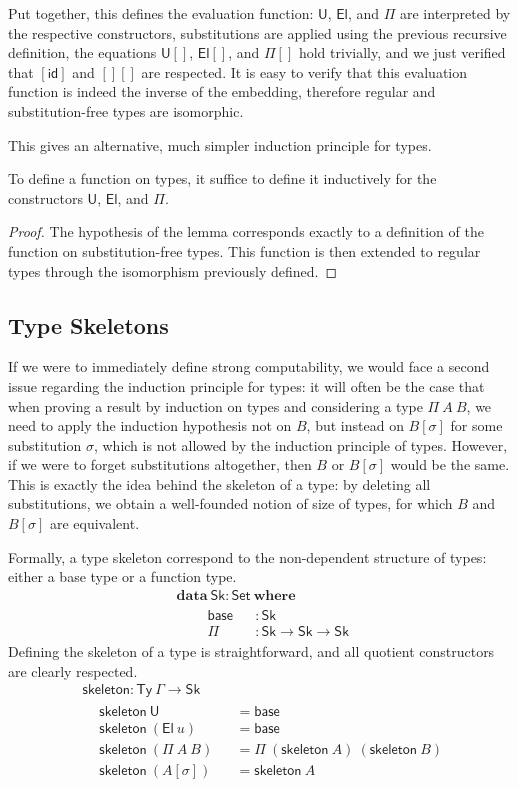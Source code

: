 \documentclass[a4paper,UKenglish,cleveref]{lipics-v2019}
\newcommand{\agdaSymb}[1]{\mathsf{#1}}
\newcommand{\agdaKW}[1]{\mathbf{#1}}
\newcommand{\ind}{\hspace{1em}}
\newcommand{\data}{\agdaKW{data}}
\newcommand{\where}{\agdaKW{where}}
\newcommand{\Set}{\agdaSymb{Set}}
\newcommand{\Ty}{\agdaSymb{Ty}}
\newcommand{\id}{\agdaSymb{id}}
\newcommand{\U}{\agdaSymb{U}}
\newcommand{\El}{\agdaSymb{El}}
\newcommand{\Sk}{\agdaSymb{Sk}}
\newcommand{\base}{\agdaSymb{base}}
\newcommand{\skel}{\agdaSymb{skeleton}}
\begin{document}
Put together, this defines the evaluation function: $\U$, $\El$, and $\Pi$ are
interpreted by the respective constructors, substitutions are applied using the
previous recursive definition, the equations $\U[]$, $\El[]$, and $\Pi[]$ hold
trivially, and we just verified that $[\id]$ and $[][]$ are respected.
It is easy to verify that this evaluation function is indeed the inverse of
the embedding, therefore regular and substitution-free types are isomorphic.

This gives an alternative, much simpler induction principle for types.
\begin{lemma}
  \label{lem:typeInduction}
  To define a function on types, it suffice to define it inductively for the
  constructors $\U$, $\El$, and $\Pi$.
\end{lemma}
\begin{proof}
  The hypothesis of the lemma corresponds exactly to a definition of the
  function on substitution-free types. This function is then extended to regular
  types through the isomorphism previously defined.
\end{proof}

\subsection{Type Skeletons}
If we were to immediately define strong computability, we would face a second
issue regarding the induction principle for types: it will often be the case
that when proving a result by induction on types and considering a type
$\Pi\ A\ B$, we need to apply the induction hypothesis not on $B$, but instead
on $B[\sigma]$ for some substitution $\sigma$, which is not allowed by the
induction principle of types. However, if we were to forget substitutions
altogether, then $B$ or $B[\sigma]$ would be the same. This is exactly the idea
behind the skeleton of a type: by deleting all substitutions, we obtain a
well-founded notion of size of types, for which $B$ and $B[\sigma]$ are equivalent.

Formally, a type skeleton correspond to the non-dependent structure of types:
either a base type or a function type.
\begin{align*}
  & \data\ \Sk : \Set\ \where \\ & \ind
  \begin{alignedat}{2}
    & \base && : \Sk \\
    & \Pi && : \Sk \to \Sk \to \Sk
  \end{alignedat}
\end{align*}
Defining the skeleton of a type is straightforward, and all quotient
constructors are clearly respected.
\begin{align*}
  & \skel : \Ty\ \Gamma \to \Sk \\ &
  \begin{alignedat}{2}
    & \skel\ \U && = \base \\
    & \skel\ (\El\ u) && = \base \\
    & \skel\ (\Pi\ A\ B) && = \Pi\ (\skel\ A)\ (\skel\ B) \\
    & \skel\ (A[\sigma]) && = \skel\ A
  \end{alignedat}
\end{align*}
\end{document}
